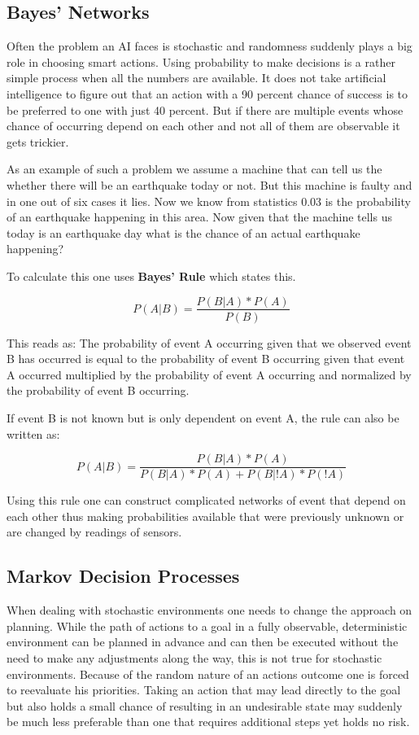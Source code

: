 \subsection{Bayes' Networks}

Often the problem an AI faces is stochastic and randomness suddenly plays a big role in choosing smart actions. Using probability to make decisions is a rather simple process when all the numbers are available. It does not take artificial intelligence to figure out that an action with a 90 percent chance of success is to be preferred to one with just 40 percent. But if there are multiple events whose chance of occurring depend on each other and not all of them are observable it gets trickier.

As an example of such a problem we assume a machine that can tell us the whether there will be an earthquake today or not. But this machine is faulty and in one out of six cases it lies. Now we know from statistics 0.03 is the probability of an earthquake happening in this area. Now given that the machine tells us today is an earthquake day what is the chance of an actual earthquake happening?

To calculate this one uses {\bf Bayes' Rule} which states this. 

\[P(A|B)=\frac{P(B|A) * P(A)}{P(B)}\]

This reads as: The probability of event A occurring given that we observed event B has occurred is equal to the probability of event B occurring given that event A occurred multiplied by the probability of event A occurring and normalized by the probability of event B occurring.

If event B is not known but is only dependent on event A, the rule can also be written as:

\[P(A|B)=\frac{P(B|A) * P(A)}{P(B|A)*P(A)+P(B|!A)*P(!A)}\]

Using this rule one can construct complicated networks of event that depend on each other thus making probabilities available that were previously unknown or are changed by readings of sensors.

\subsection{Markov Decision Processes}

When dealing with stochastic environments one needs to change the approach on planning. While the path of actions to a goal in a fully observable, deterministic environment can be planned in advance and can then be executed without the need to make any adjustments along the way, this is not true for stochastic environments. Because of the random nature of an actions outcome one is forced to reevaluate his priorities. Taking an action that may lead directly to the goal but also holds a small chance of resulting in an undesirable state may suddenly be much less preferable than one that requires additional steps yet holds no risk.

